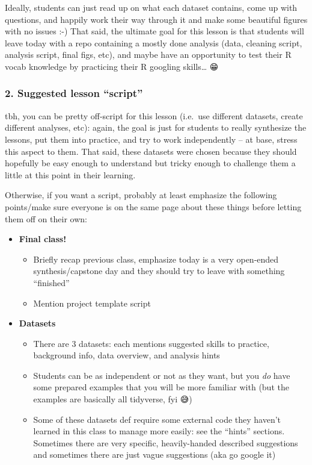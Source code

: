 \documentclass[
  letterpaper,
  DIV=11,
  numbers=noendperiod]{scrreprt}
\providecommand{\tightlist}{%
  \setlength{\itemsep}{0pt}\setlength{\parskip}{0pt}}\usepackage{longtable,booktabs,array}
\begin{document}
\begin{tcolorbox}
Ideally, students can just read up on what each dataset contains, come
up with questions, and happily work their way through it and make some
beautiful figures with no issues :-) That said, the ultimate goal for
this lesson is that students will leave today with a repo containing a
mostly done analysis (data, cleaning script, analysis script, final
figs, etc), and maybe have an opportunity to test their R vocab
knowledge by practicing their R googling skills\ldots{} 😁

\hypertarget{suggested-lesson-script}{%
\subsubsection{2. Suggested lesson
``script''}\label{suggested-lesson-script}}

tbh, you can be pretty off-script for this lesson (i.e.~use different
datasets, create different analyses, etc): again, the goal is just for
students to really synthesize the lessons, put them into practice, and
try to work independently -- at base, stress this aspect to them. That
said, these datasets were chosen because they should hopefully be easy
enough to understand but tricky enough to challenge them a little at
this point in their learning.

Otherwise, if you want a script, probably at least emphasize the
following points/make sure everyone is on the same page about these
things before letting them off on their own:

\begin{itemize}
\tightlist
\item
  \textbf{Final class!}

  \begin{itemize}
  \tightlist
  \item
    Briefly recap previous class, emphasize today is a very open-ended
    synthesis/capstone day and they should try to leave with something
    ``finished''
  \item
    Mention project template script
  \end{itemize}
\item
  \textbf{Datasets}

  \begin{itemize}
  \tightlist
  \item
    There are 3 datasets: each mentions suggested skills to practice,
    background info, data overview, and analysis hints
  \item
    Students can be as independent or not as they want, but you
    \emph{do} have some prepared examples that you will be more familiar
    with (but the examples are basically all tidyverse, fyi 😅)
  \item
    Some of these datasets def require some external code they haven't
    learned in this class to manage more easily: see the ``hints''
    sections. Sometimes there are very specific, heavily-handed
    described suggestions and sometimes there are just vague suggestions
    (aka go google it)
  \end{itemize}
\end{itemize}


\end{tcolorbox}
\end{document}
